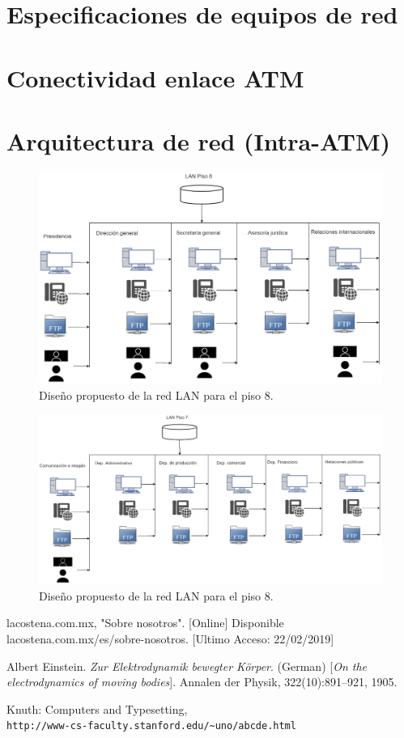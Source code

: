 \documentclass[12pt,letterpaper]{article}
\begin{document}
\newpage
\section{Especificaciones de equipos de red}

\newpage
\section{Conectividad enlace ATM}

\newpage
\section{Arquitectura de red (Intra-ATM)}
\begin{figure}[ht]
    \centering
    \includegraphics[width=.9\textwidth,angle=90]{imagenes/Lan8.png}
    \caption{Diseño propuesto de la red LAN para el piso 8.}
\end{figure}

\newpage
\begin{figure}[ht]
    \centering
    \includegraphics[width=.9\textwidth,angle=90]{imagenes/Lan7.png}
    \caption{Diseño propuesto de la red LAN para el piso 8.}
\end{figure}

\newpage
\begin{thebibliography}{20}
    lacostena.com.mx, "Sobre nosotros". 
    [Online] Disponible lacostena.com.mx/es/sobre-nosotros.
    [Ultimo Acceso: 22/02/2019]
     
    Albert Einstein. 
    \textit{Zur Elektrodynamik bewegter K{\"o}rper}. (German) 
    [\textit{On the electrodynamics of moving bodies}]. 
    Annalen der Physik, 322(10):891–921, 1905.
     
    Knuth: Computers and Typesetting,
    \\\texttt{http://www-cs-faculty.stanford.edu/\~{}uno/abcde.html}
\end{thebibliography}
\end{document}
